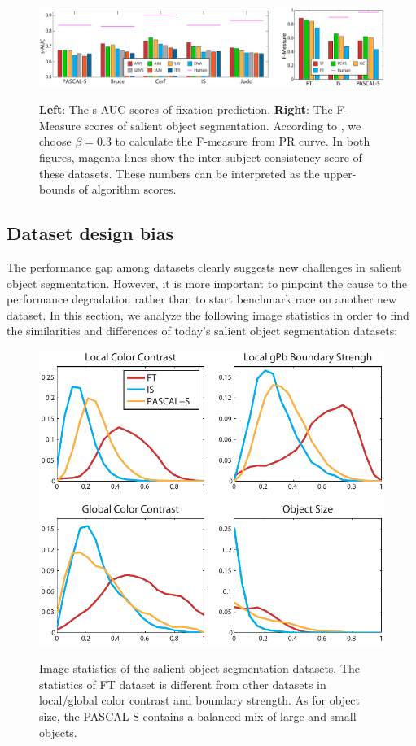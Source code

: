 \begin{figure}[bth]
\centering
\includegraphics[width=1.0\linewidth]{auc_pr_all2.pdf}\\
\caption{\textbf{Left}: The s-AUC scores of fixation prediction.  \textbf{Right}: The F-Measure scores of salient object segmentation.  According to \cite{achanta2009frequency},  we choose $\beta = 0.3$ to calculate the F-measure from PR curve. In both figures, magenta lines show the inter-subject consistency score of these datasets. These numbers can be interpreted as the upper-bounds of algorithm scores. }\label{fig:fullBench}
\end{figure}



\subsection{Dataset design bias}
The performance gap among datasets clearly suggests new challenges in salient object segmentation.  However, it is more important to pinpoint the cause to the performance degradation rather than to start benchmark race on another new dataset.  In this section, we analyze the following image statistics in order to find the similarities and differences of today's salient object segmentation datasets:

\begin{figure}[t]
\centering
\includegraphics[width=0.7\linewidth]{designBias.pdf}\\
\caption{Image statistics of the salient object segmentation datasets.  The statistics of FT dataset is different from other datasets in local/global color contrast and boundary strength.  As for object size, the PASCAL-S contains a balanced mix of large and small objects.}\label{fig:designBias}
\end{figure}


